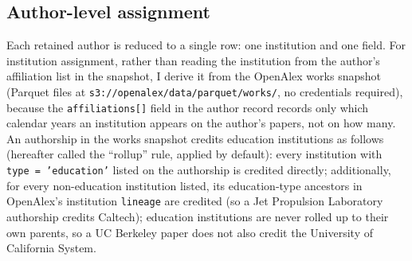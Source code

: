 \subsection{Author-level assignment}
\label{subsec:author-assignment}
Each retained author is reduced to a single row: one institution and one field. For institution assignment, rather than reading the institution from the author's affiliation list in the snapshot, I derive it from the OpenAlex works snapshot (Parquet files at \texttt{s3://openalex/data/parquet/works/}, no credentials required), because the \texttt{affiliations[]} field in the author record records only which calendar years an institution appears on the author's papers, not on how many. An authorship in the works snapshot credits education institutions as follows (hereafter called the ``rollup'' rule, applied by default): every institution with \texttt{type = 'education'} listed on the authorship is credited directly; additionally, for every non-education institution listed, its education-type ancestors in OpenAlex's institution \texttt{lineage} are credited (so a Jet Propulsion Laboratory authorship credits Caltech); education institutions are never rolled up to their own parents, so a UC Berkeley paper does not also credit the University of California System.
